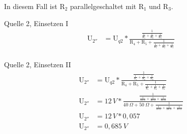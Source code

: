 \documentclass[aspectratio=169, ignorenonframetext]{beamer}
\begin{document}
In diesem Fall ist $\text{R}_2$ parallelgeschaltet mit $\text{R}_1$ und $\text{R}_3$.
\begin{frame}{Quelle 2, Einsetzen I}
  \begin{align}
    \text{U}_{2''} &= \text{U}_{q2}*\frac{\frac{1}{\frac{1}{\text{R}_1}+\frac{1}{\text{R}_2}+\frac{1}{\text{R}_3}}}{\text{R}_4 + \text{R}_5 + \frac{1}{\frac{1}{\text{R}_1}+\frac{1}{\text{R}_2}+\frac{1}{\text{R}_3}}}\\
  \end{align}
\end{frame}

\begin{frame}{Quelle 2, Einsetzen II}
  \begin{align}
    \text{U}_{2''} &= \text{U}_{q2}*\frac{\frac{1}{\frac{1}{\text{R}_1}+\frac{1}{\text{R}_2}+\frac{1}{\text{R}_3}}}{\text{R}_4 + \text{R}_5 + \frac{1}{\frac{1}{\text{R}_1}+\frac{1}{\text{R}_2}+\frac{1}{\text{R}_3}}}\\
    \text{U}_{2''} &= 12\,V*\frac{\frac{1}{\frac{1}{10\ \Omega}+\frac{1}{20\ \Omega}+\frac{1}{30\ \Omega}}}{40\ \Omega + 50\ \Omega + \frac{1}{\frac{1}{10\ \Omega}+\frac{1}{20\ \Omega}+\frac{1}{30\ \Omega}}}\\
    \text{U}_{2''} &= 12\,V*0,057 \\
    \text{U}_{2''} &= 0,685\ V
  \end{align}
\end{frame}
\end{document}
